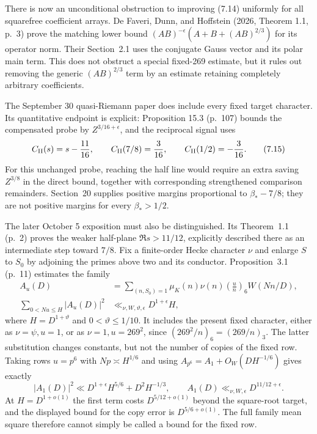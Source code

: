 \documentclass[11pt]{article}
\begin{document}
There is now an unconditional obstruction to improving (7.14) uniformly for all squarefree coefficient arrays. De Faveri, Dunn, and Hoffstein (2026, Theorem 1.1, p.~3) prove the matching lower bound $(AB)^{-\epsilon}(A+B+(AB)^{2/3})$ for its operator norm. Their Section~2.1 uses the conjugate Gauss vector and its polar main term. This does not obstruct a special fixed-269 estimate, but it rules out removing the generic $(AB)^{2/3}$ term by an estimate retaining completely arbitrary coefficients.

The September 30 quasi-Riemann paper does include every fixed target character. Its quantitative endpoint is explicit: Proposition 15.3 (p.~107) bounds the compensated probe by $Z^{3/16+\epsilon}$, and the reciprocal signal uses
\[
 C_{\rm II}(s)=s-\frac{11}{16},\qquad
 C_{\rm II}(7/8)=\frac3{16},\qquad C_{\rm II}(1/2)=-\frac3{16}.
 \tag{7.15}
\]
For this unchanged probe, reaching the half line would require an extra saving $Z^{3/8}$ in the direct bound, together with corresponding strengthened comparison remainders. Section~20 supplies positive margins proportional to $\beta_*-7/8$; they are not positive margins for every $\beta_*>1/2$.

The later October 5 exposition must also be distinguished. Its Theorem~1.1 (p.~2) proves the weaker half-plane $\Re s>11/12$, explicitly described there as an intermediate step toward $7/8$. Fix a finite-order Hecke character $\nu$ and enlarge $S$ to $S_0$ by adjoining the primes above two and its conductor. Proposition~3.1 (p.~11) estimates the family
\[
 \begin{aligned}
 A_u(D)&=\sum_{(n,S_0)=1}\mu_K(n)\nu(n)
       \left(\frac un\right)_6 W(Nn/D),\\
 \sum_{0<Nu\le H}|A_u(D)|^2&\ll_{\nu,W,\vartheta,\epsilon}D^{1+\epsilon}H,
 \end{aligned}
 \tag{7.16}
\]
where $H=D^{1+\vartheta}$ and $0<\vartheta\le1/10$. It includes the present fixed character, either as $\nu=\psi,u=1$, or as $\nu=1,u=269^2$, since $(269^2/n)_6=(269/n)_3$. The latter substitution changes constants, but not the number of copies of the fixed row. Taking rows $u=p^6$ with $Np\asymp H^{1/6}$ and using $A_{p^6}=A_1+O_W(DH^{-1/6})$ gives exactly
\[
 |A_1(D)|^2\ll D^{1+\epsilon}H^{5/6}+D^2H^{-1/3},
 \qquad A_1(D)\ll_{\nu,W,\epsilon}D^{11/12+\epsilon}.
 \tag{7.17}
\]
At $H=D^{1+o(1)}$ the first term costs $D^{5/12+o(1)}$ beyond the square-root target, and the displayed bound for the copy error is $D^{5/6+o(1)}$. The full family mean square therefore cannot simply be called a bound for the fixed row.
\end{document}
